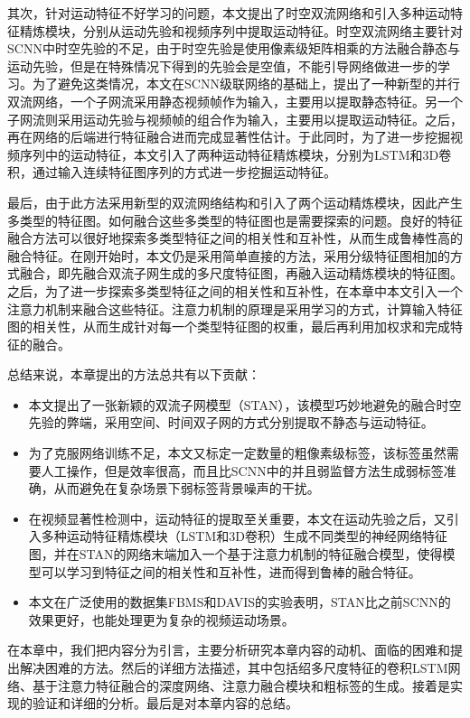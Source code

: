 其次，针对运动特征不好学习的问题，本文提出了时空双流网络和引入多种运动特征精炼模块，分别从运动先验和视频序列中提取运动特征。时空双流网络主要针对SCNN中时空先验的不足，由于时空先验是使用像素级矩阵相乘的方法融合静态与运动先验，但是在特殊情况下得到的先验会是空值，不能引导网络做进一步的学习。为了避免这类情况，本文在SCNN级联网络的基础上，提出了一种新型的并行双流网络，一个子网流采用静态视频帧作为输入，主要用以提取静态特征。另一个子网流则采用运动先验与视频帧的组合作为输入，主要用以提取运动特征。之后，再在网络的后端进行特征融合进而完成显著性估计。于此同时，为了进一步挖掘视频序列中的运动特征，本文引入了两种运动特征精炼模块，分别为LSTM和3D卷积，通过输入连续特征图序列的方式进一步挖掘运动特征。

最后，由于此方法采用新型的双流网络结构和引入了两个运动精炼模块，因此产生多类型的特征图。如何融合这些多类型的特征图也是需要探索的问题。良好的特征融合方法可以很好地探索多类型特征之间的相关性和互补性，从而生成鲁棒性高的融合特征。在刚开始时，本文仍是采用简单直接的方法，采用分级特征图相加的方式融合，即先融合双流子网生成的多尺度特征图，再融入运动精炼模块的特征图。之后，为了进一步探索多类型特征之间的相关性和互补性，在本章中本文引入一个注意力机制来融合这些特征。注意力机制的原理是采用学习的方式，计算输入特征图的相关性，从而生成针对每一个类型特征图的权重，最后再利用加权求和完成特征的融合。

总结来说，本章提出的方法总共有以下贡献：
\begin{itemize}
  \item 本文提出了一张新颖的双流子网模型（STAN），该模型巧妙地避免的融合时空先验的弊端，采用空间、时间双子网的方式分别提取不静态与运动特征。
  \item 为了克服网络训练不足，本文又标定一定数量的粗像素级标签，该标签虽然需要人工操作，但是效率很高，而且比SCNN中的并且弱监督方法生成弱标签准确，从而避免在复杂场景下弱标签背景噪声的干扰。
  \item 在视频显著性检测中，运动特征的提取至关重要，本文在运动先验之后，又引入多种运动特征精炼模块（LSTM和3D卷积）生成不同类型的神经网络特征图，并在STAN的网络末端加入一个基于注意力机制的特征融合模型，使得模型可以学习到特征之间的相关性和互补性，进而得到鲁棒的融合特征。
  \item 本文在广泛使用的数据集FBMS和DAVIS的实验表明，STAN比之前SCNN的效果更好，也能处理更为复杂的视频运动场景。
\end{itemize}

在本章中，我们把内容分为引言，主要分析研究本章内容的动机、面临的困难和提出解决困难的方法。然后的详细方法描述，其中包括绍多尺度特征的卷积LSTM网络、基于注意力特征融合的深度网络、注意力融合模块和粗标签的生成。接着是实现的验证和详细的分析。最后是对本章内容的总结。

